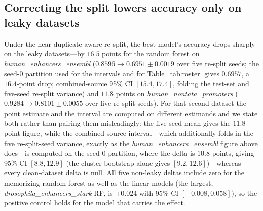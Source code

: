 \documentclass[webpdf,modern,large,namedate]{oup-authoring-template}%
\begin{document}
\begin{table}[tbp]
\begin{center}
\begin{minipage}{\textwidth}
\caption{Near-duplicate leakage report card. \textbf{Verdict} is LEAKY if the full-scale near-duplicate test fraction exceeds $0.1$ at Jaccard $0.7$; a ``clean'' verdict means only \emph{no forward-strand near-duplicate leakage detected}, subject to the disclosed length-pair cap. ``leak@0.7 (Jac / con)'' gives the leak fraction under the $8$-mer Jaccard and the length-robust containment index. ``Acc.\ lost'' is the best-model accuracy change under the near-duplicate-aware re-split (positive $=$ accuracy lost; accuracy fraction). ``RF rank'' is the random-forest rank before$\to$after correction. ``Reorders under chrom.-holdout?'' reports whether the best-model change reproduces under the chromosome-holdout control (measured for the two leaky datasets only). All leak fractions are full-scale. $^{\dagger}$\textit{demo\_coding\_vs\_intergenomic\_seqs} is clean under $8$-mer Jaccard ($0.078$) but its full-scale containment leak fraction ($0.131$) exceeds $0.1$---a borderline case the length-robust metric flags and the length-blind one misses.\label{tab:reportcard}}
\resizebox{\textwidth}{!}{}
\end{minipage}
\end{center}
\end{table}

\subsection{Correcting the split lowers accuracy only on leaky datasets}
Under the near-duplicate-aware re-split, the best model's accuracy drops sharply on the leaky datasets---by $16.5$ points for the random forest on \textit{human\_enhancers\_ensembl} ($0.8596\to0.6951\pm0.0019$ over five re-split seeds; the seed-$0$ partition used for the intervals and for Table~\ref{tab:roster} gives $0.6957$, a $16.4$-point drop; combined-source 95\% CI $[15.4,17.4]$, folding the test-set and five-seed re-split variance) and $11.8$ points on \textit{human\_nontata\_promoters} ($0.9284\to0.8101\pm0.0055$ over five re-split seeds). For that second dataset the point estimate and the interval are computed on different estimands and we state both rather than pairing them misleadingly: the five-seed mean gives the $11.8$-point figure, while the combined-source interval---which additionally folds in the five re-split-seed variance, exactly as the \textit{human\_enhancers\_ensembl} figure above does---is computed on the seed-$0$ partition, where the delta is $10.8$ points, giving 95\% CI $[8.8,12.9]$ (the cluster bootstrap alone gives $[9.2,12.6]$)---whereas every clean-dataset delta is null. All five non-leaky deltas include zero for the memorizing random forest as well as the linear models (the largest, \textit{drosophila\_enhancers\_stark} RF, is $+0.024$ with 95\% CI $[-0.008,0.058]$), so the positive control holds for the model that carries the effect. 
\end{document}
